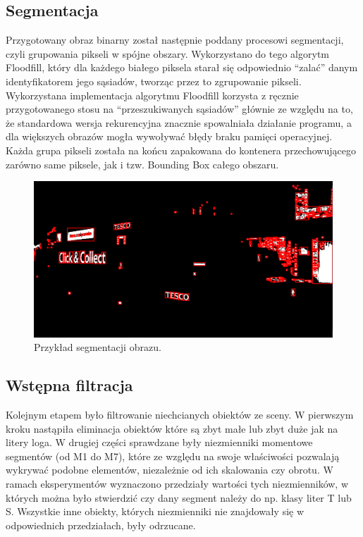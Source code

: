 \documentclass[11pt,a4paper]{article} %
\numberwithin{equation}{section} %
\numberwithin{figure}{section} %
\numberwithin{table}{section} %
\begin{document}
\subsection{Segmentacja}

Przygotowany obraz binarny został następnie poddany procesowi segmentacji, czyli grupowania pikseli w spójne obszary. Wykorzystano do tego algorytm Floodfill, który dla każdego białego piksela starał się odpowiednio ``zalać'' danym identyfikatorem jego sąsiadów, tworząc przez to zgrupowanie pikseli. Wykorzystana implementacja algorytmu Floodfill korzysta z ręcznie przygotowanego stosu na ``przeszukiwanych sąsiadów'' głównie ze względu na to, że standardowa wersja rekurencyjna znacznie spowalniała działanie programu, a dla większych obrazów mogła wywoływać błędy braku pamięci operacyjnej. Każda grupa pikseli została na końcu zapakowana do kontenera przechowującego zarówno same piksele, jak i tzw. Bounding Box całego obszaru.

\begin{figure}
	\centering
	\includegraphics[width=14cm]{pobr_proj_seg1.png}
	\caption{Przykład segmentacji obrazu.}
	\label{fig:pobr_proj_seg1}
\end{figure}


\subsection{Wstępna filtracja}

Kolejnym etapem było filtrowanie niechcianych obiektów ze sceny. W pierwszym kroku nastąpiła eliminacja obiektów które są zbyt małe lub zbyt duże jak na litery loga. W drugiej części sprawdzane były niezmienniki momentowe segmentów (od M1 do M7), które ze względu na swoje właściwości pozwalają wykrywać podobne elementów, niezależnie od ich skalowania czy obrotu. W ramach eksperymentów wyznaczono przedziały wartości tych niezmienników, w których można było stwierdzić czy dany segment należy do np. klasy liter T lub S. Wszystkie inne obiekty, których niezmienniki nie znajdowały się w odpowiednich przedziałach, były odrzucane.
\end{document}
